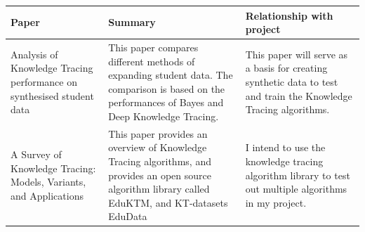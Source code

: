 \documentclass[11pt]{article}
\begin{document}
\begin{tabularx}{\textwidth}
    {
        >{\raggedright\arraybackslash}X
        >{\raggedright\arraybackslash}X
        >{\raggedright\arraybackslash}X
    }
    \toprule
    Paper                                                                                                                                                                                                                                                                                                       & Summary & Relationship with project \\
    \midrule\endhead{}
    Analysis of Knowledge Tracing performance on synthesised student data~\autocite{pagonis2024studentsynthesis}                                                                                                                                                                                               &
    This paper compares different methods of expanding student data. The comparison is based on the performances of Bayes and Deep Knowledge Tracing.                                                                                                                                                           &
    This paper will serve as a basis for creating synthetic data to test and train the Knowledge Tracing algorithms.                                                                                                                                                                                                                                  \\

    \midrule
    A Survey of Knowledge Tracing: Models, Variants, and Applications~\autocite{Shen_2024}                                                                                                                                                                                                                     &
    This paper provides an overview of Knowledge Tracing algorithms, and provides an open source algorithm library called EduKTM, and KT-datasets EduData                                                                                                                                                       &
    I intend to use the knowledge tracing algorithm library to test out multiple algorithms in my project.                                                                                                                                                                                                                                            \\


\end{tabularx}
\end{document}
